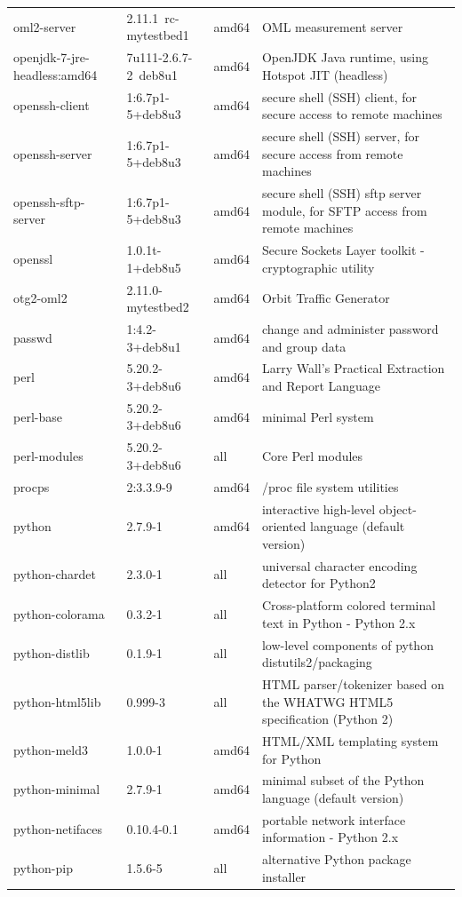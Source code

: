 \documentclass[a4paper,10pt]{article}
\begin{document}
\begin{appendices}
{\begin{longtable}{p{3.25cm}@{\hspace{0.25cm}}p{4cm}@{\hspace{0.25cm}}l@{\hspace{0.25cm}}p{7cm}}
oml2-server	&	2.11.1~rc-mytestbed1	&	amd64	&	OML measurement server	\\
openjdk-7-jre-headless:amd64	&	7u111-2.6.7-2~deb8u1	&	amd64	&	OpenJDK Java runtime, using Hotspot JIT (headless)	\\
openssh-client	&	1:6.7p1-5+deb8u3	&	amd64	&	secure shell (SSH) client, for secure access to remote machines	\\
openssh-server	&	1:6.7p1-5+deb8u3	&	amd64	&	secure shell (SSH) server, for secure access from remote machines	\\
openssh-sftp-server	&	1:6.7p1-5+deb8u3	&	amd64	&	secure shell (SSH) sftp server module, for SFTP access from remote machines	\\
openssl	&	1.0.1t-1+deb8u5	&	amd64	&	Secure Sockets Layer toolkit - cryptographic utility	\\
otg2-oml2	&	2.11.0-mytestbed2	&	amd64	&	Orbit Traffic Generator	\\
passwd	&	1:4.2-3+deb8u1	&	amd64	&	change and administer password and group data	\\
perl	&	5.20.2-3+deb8u6	&	amd64	&	Larry Wall's Practical Extraction and Report Language	\\
perl-base	&	5.20.2-3+deb8u6	&	amd64	&	minimal Perl system	\\
perl-modules	&	5.20.2-3+deb8u6	&	all	&	Core Perl modules	\\
procps	&	2:3.3.9-9	&	amd64	&	/proc file system utilities	\\
python	&	2.7.9-1	&	amd64	&	interactive high-level object-oriented language (default version)	\\
python-chardet	&	2.3.0-1	&	all	&	universal character encoding detector for Python2	\\
python-colorama	&	0.3.2-1	&	all	&	Cross-platform colored terminal text in Python - Python 2.x	\\
python-distlib	&	0.1.9-1	&	all	&	low-level components of python distutils2/packaging	\\
python-html5lib	&	0.999-3	&	all	&	HTML parser/tokenizer based on the WHATWG HTML5 specification (Python 2)	\\
python-meld3	&	1.0.0-1	&	amd64	&	HTML/XML templating system for Python	\\
python-minimal	&	2.7.9-1	&	amd64	&	minimal subset of the Python language (default version)	\\
python-netifaces	&	0.10.4-0.1	&	amd64	&	portable network interface information - Python 2.x	\\
python-pip	&	1.5.6-5	&	all	&	alternative Python package installer	\\

\end{longtable}}
\end{appendices}
\end{document}
